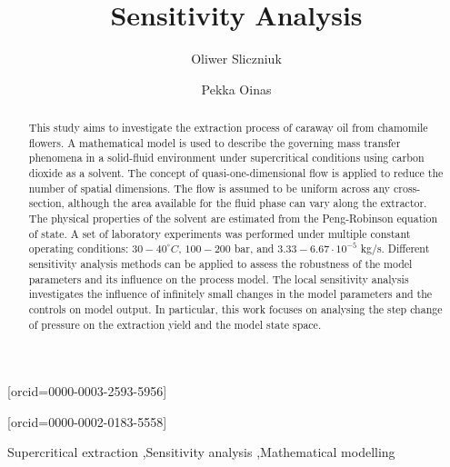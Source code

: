 \documentclass[a4paper,fleqn]{cas-dc}
\begin{document}
 

\title[mode=title]{Sensitivity Analysis}                      


\author[1]{Oliwer Sliczniuk}[orcid=0000-0003-2593-5956]
\cormark[1]

\author[1]{Pekka Oinas}[orcid=0000-0002-0183-5558]


\address[1]{Aalto University, School of Chemical Engineering, Espoo, 02150, Finland}


\begin{abstract}
This study aims to investigate the extraction process of caraway oil from chamomile flowers. A mathematical model is used to describe the governing mass transfer phenomena in a solid-fluid environment under supercritical conditions using carbon dioxide as a solvent. The concept of quasi-one-dimensional flow is applied to reduce the number of spatial dimensions. The flow is assumed to be uniform across any cross-section, although the area available for the fluid phase can vary along the extractor. The physical properties of the solvent are estimated from the Peng-Robinson equation of state. A set of laboratory experiments was performed under multiple constant operating conditions: $30 - 40^\circ C$, $100 - 200$ bar, and $3.33-6.67 \cdot 10^{-5}$ kg/s. Different sensitivity analysis methods can be applied to assess the robustness of the model parameters and its influence on the process model. The local sensitivity analysis investigates the influence of infinitely small changes in the model parameters and the controls on model output. In particular,  this work focuses on analysing the step change of pressure on the extraction yield and the model state space.

\end{abstract}

\begin{keywords}
Supercritical extraction \sep Sensitivity analysis \sep Mathematical modelling
\end{keywords}
\end{document}
